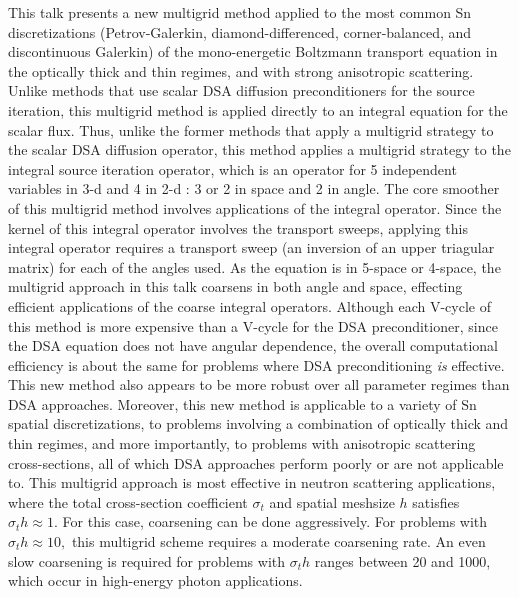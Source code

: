 \documentclass{report}
\begin{document}
This talk presents a new multigrid method applied to the most common Sn discretizations 
(Petrov-Galerkin, diamond-differenced, corner-balanced, and discontinuous Galerkin) of
the mono-energetic Boltzmann transport equation in the optically thick and thin regimes, and
with strong anisotropic scattering. Unlike methods that use scalar DSA diffusion preconditioners 
for the source iteration, this multigrid method is applied directly to an integral equation for the 
scalar flux. Thus, unlike the former methods that apply a multigrid strategy to the scalar DSA 
diffusion operator, this method applies a multigrid strategy to the integral source iteration
operator, which is an operator for 5 independent variables in 3-d and 4 in 2-d : 3 or 2 in space 
and 2 in angle. The core smoother of this multigrid method involves applications
of the integral operator. Since the kernel of this integral operator involves 
the transport sweeps, applying this integral operator requires a transport sweep
(an inversion of an upper triagular matrix) for each of the angles used. As the equation is in 
5-space or 4-space, the multigrid approach in this talk coarsens in both angle and space,
effecting efficient applications of the coarse integral operators. Although each V-cycle
of this method is more expensive than a V-cycle for the DSA preconditioner, since the DSA equation 
does not have angular dependence, the overall computational efficiency is about
the same for problems where DSA preconditioning {\it is} effective. This new method also appears
to be more robust over all parameter regimes than DSA approaches. Moreover, this new method is 
applicable to a variety of Sn spatial discretizations, to problems involving a combination
of optically thick and thin regimes, and more importantly, to problems with anisotropic
scattering cross-sections, all of which DSA approaches perform poorly or are not applicable to.
This multigrid approach is most effective in neutron scattering applications, where the total 
cross-section coefficient $\sigma_t$ and spatial meshsize $h$ satisfies $\sigma_t h\approx 1.$
For this case, coarsening can be done aggressively. For problems with $\sigma_t h\approx 10,$ this
multigrid scheme requires a moderate coarsening rate. An even slow coarsening is required
for problems with $\sigma_t h$ ranges between 20 and 1000, which occur in high-energy photon applications.
\end{document}
